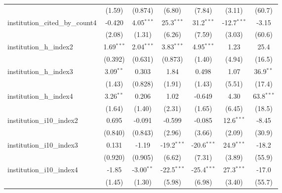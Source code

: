 \begin{tabular}{lcccccc}
                                         & (1.59)        & (0.874)      & (6.80)        & (7.84)        & (3.11)        & (60.7)\\   
   institution\_cited\_by\_count4        & -0.420        & 4.05$^{***}$ & 25.3$^{***}$  & 31.2$^{***}$  & -12.7$^{***}$ & -3.15\\   
                                         & (2.08)        & (1.31)       & (6.26)        & (7.59)        & (3.03)        & (60.6)\\   
   institution\_h\_index2                & 1.69$^{***}$  & 2.04$^{***}$ & 3.83$^{***}$  & 4.95$^{***}$  & 1.23          & 25.4\\   
                                         & (0.392)       & (0.631)      & (0.873)       & (1.40)        & (4.94)        & (16.5)\\   
   institution\_h\_index3                & 3.09$^{**}$   & 0.303        & 1.84          & 0.498         & 1.07          & 36.9$^{**}$\\   
                                         & (1.43)        & (0.828)      & (1.91)        & (1.43)        & (5.51)        & (17.4)\\   
   institution\_h\_index4                & 3.26$^{**}$   & 0.206        & 1.02          & -0.649        & 4.30          & 63.8$^{***}$\\   
                                         & (1.64)        & (1.40)       & (2.31)        & (1.65)        & (6.45)        & (18.5)\\   
   institution\_i10\_index2              & 0.695         & -0.091       & -0.599        & -0.085        & 12.6$^{***}$  & -8.45\\   
                                         & (0.840)       & (0.843)      & (2.96)        & (3.66)        & (2.09)        & (30.9)\\   
   institution\_i10\_index3              & 0.131         & -1.19        & -19.2$^{***}$ & -20.6$^{***}$ & 24.9$^{***}$  & -18.2\\   
                                         & (0.920)       & (0.905)      & (6.62)        & (7.31)        & (3.89)        & (55.9)\\   
   institution\_i10\_index4              & -1.85         & -3.00$^{**}$ & -22.5$^{***}$ & -25.4$^{***}$ & 27.3$^{***}$  & -17.0\\   
                                         & (1.45)        & (1.30)       & (5.98)        & (6.98)        & (3.40)        & (55.7)\\   

\end{tabular}
